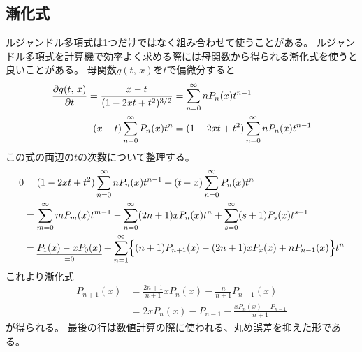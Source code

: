 \documentclass[../../master.tex]{subfiles}
\begin{document}
\subsection{漸化式}
ルジャンドル多項式は1つだけではなく組み合わせて使うことがある。
ルジャンドル多項式を計算機で効率よく求める際には母関数から得られる漸化式を使うと良いことがある。
母関数\(g(t,\,x)\)を\(t\)で偏微分すると
\begin{align}
	\pdv{g(t,\,x)}{t} = \frac{x-t}{(1-2xt+t^2)^{3/2}} & = \sum_{n=0}^{\infty} nP_n(x)t^{n-1}            \\
	(x-t)\sum_{n=0}^{\infty} P_n(x) t^n               & = (1-2xt+t^2)\sum_{n=0}^{\infty} nP_n(x)t^{n-1}
\end{align}
この式の両辺の\(t\)の次数について整理する。
\begin{equation}\begin{aligned}[b]
    0 & = (1-2xt+t^2)\sum_{n=0}^{\infty} nP_n(x)t^{n-1} +(t-x)\sum_{n=0}^{\infty} P_n(x) t^n \\
	  & = \sum_{m=0}^{\infty} mP_m(x)t^{m-1}
	- \sum_{n=0}^{\infty}(2n+1)xP_n(x)t^n
	+ \sum_{s=0}^{\infty} (s+1)P_s(x)t^{s+1}                                                 \\
	  & = \underset{=0}{\underline{P_1(x) -xP_0(x)}}+
	\sum_{n=1}^{\infty} \Bigl\{
	(n+1)P_{n+1}(x) - (2n+1)xP_x(x) + nP_{n-1}(x)
	\Bigr\}t^n
\end{aligned}\end{equation}
これより漸化式
\begin{align}
	P_{n+1}(x) & = \frac{2n+1}{n+1}xP_n(x)-\frac{n}{n+1}P_{n-1}(x) \label{eq:legendre_recurrece1} \\
	           & = 2xP_n(x)-P_{n-1} -\frac{xP_n(x)-P_{n-1}}{n+1}
\end{align}
が得られる。
最後の行は数値計算の際に使われる、丸め誤差を抑えた形である。
\end{document}
